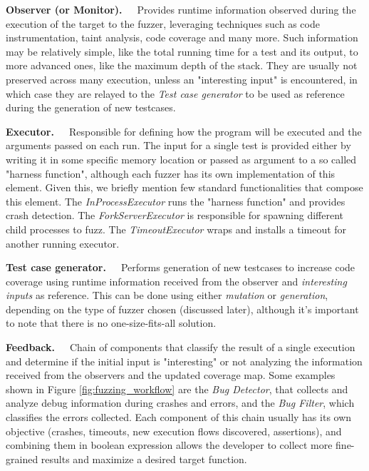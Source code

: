 \textbf{Observer (or Monitor).}\ \ \ Provides runtime information observed during the execution of the target to the fuzzer, leveraging techniques such as code instrumentation, taint analysis, code coverage and many more. Such information may be relatively simple, like the total running time for a test and its output, to more advanced ones, like the maximum depth of the stack. They are usually not preserved across many execution, unless an "interesting input" is encountered, in which case they are relayed to the \textit{Test case generator}  to be used as reference during the generation of new testcases. 

\textbf{Executor.}\ \ \ Responsible for defining how the program will be executed and the arguments passed on each run. The input for a single test is provided either by writing it in some specific memory location or passed as argument to a so called "harness function", although each fuzzer has its own implementation of this element. Given this, we briefly mention few standard functionalities that compose this element. The \textit{InProcessExecutor} runs the "harness function" and provides crash detection. The \textit{ForkServerExecutor} is responsible for spawning different child processes to fuzz. The \textit{TimeoutExecutor} wraps and installs a timeout for another running executor.

\textbf{Test case generator.}\ \ \ Performs generation of new testcases to increase code coverage using runtime information received from the observer and \textit{interesting inputs} as reference. This can be done using either \textit{mutation} or \textit{generation}, depending on the type of fuzzer chosen (discussed later), although it's important to note that there is no one-size-fits-all solution.

\textbf{Feedback.}\ \ \ Chain of components that classify the result of a single execution and determine if the initial input is "interesting" or not analyzing the information received from the observers and the updated coverage map. Some examples shown in Figure \ref{fig:fuzzing_workflow} are the \textit{Bug Detector}, that collects and analyze debug information during crashes and errors, and the \textit{Bug Filter}, which classifies the errors collected.
Each component of this chain usually has its own objective (crashes, timeouts, new execution flows discovered, assertions), and combining them in boolean expression allows the developer to collect more fine-grained results and maximize a desired target function.

